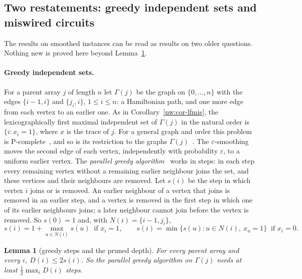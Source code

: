 \documentclass[11pt]{amsart}
\newtheorem{lemma}[theorem]{Lemma}
\theoremstyle{definition}
\theoremstyle{remark}
\newcommand{\eps}{\varepsilon}
\begin{document}
\subsection{Two restatements: greedy independent sets and miswired circuits}\label{sec:restate}

The results on smoothed instances can be read as results on two older questions. Nothing new is
proved here beyond Lemma~\ref{lem:greedysteps}.

\paragraph{Greedy independent sets.} For a parent array $j$ of length $n$ let $\Gamma(j)$ be
the graph on $\{0,\dots,n\}$ with the edges $\{i-1,i\}$ and $\{j_i,i\}$, $1\le i\le n$: a
Hamiltonian path, and one more edge from each vertex to an earlier one. As in
Corollary~\ref{nw:cor-lfmis}, the lexicographically first maximal independent set of $\Gamma(j)$
in the natural order is $\{i:x_i=1\}$, where $x$ is the trace of $j$. For a general graph and
order this problem is P-complete~\cite{ghr}, and so is its restriction to the graphs
$\Gamma(j)$~\cite{okhotin}. The $\eps$-smoothing moves the second edge of each vertex,
independently with probability $\eps$, to a uniform earlier vertex. The \emph{parallel greedy
algorithm}~\cite{nw-crt87,nw-bfs12} works in steps: in each step every remaining vertex without
a remaining earlier neighbour joins the set, and these vertices and their neighbours are
removed. Let $s(i)$ be the step in which vertex $i$ joins or is removed. An earlier neighbour of
a vertex that joins is removed in an earlier step, and a vertex is removed in the first step in
which one of its earlier neighbours joins; a later neighbour cannot join before the vertex is
removed. So $s(0)=1$ and, with $N(i)=\{i-1,j_i\}$,
\[
s(i)=1+\max_{u\in N(i)}s(u)\ \text{ if }x_i=1,\qquad s(i)=\min\{s(u):u\in N(i),\ x_u=1\}\ \text{ if }x_i=0 .
\]

\begin{lemma}[greedy steps and the pruned depth]\label{lem:greedysteps}
For every parent array and every $i$, $D(i)\le2s(i)$. So the parallel greedy algorithm on
$\Gamma(j)$ needs at least $\frac12\max_iD(i)$ steps.
\end{lemma}
\end{document}
